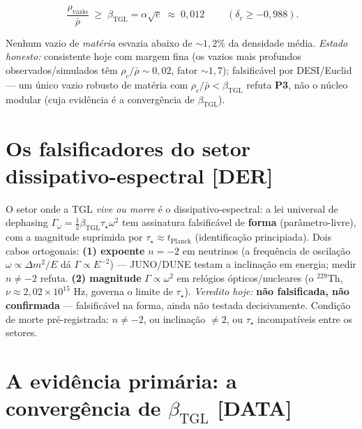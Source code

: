 \documentclass[11pt]{article}
\newcommand{\bTGL}{\beta_{\mathrm{TGL}}}\newcommand{\Msun}{M_{\odot}}\newcommand{\TGL}{\mathrm{TGL}}
\theoremstyle{definition}\newtheorem{deriv}{Derivação}
\begin{document}
\begin{equation}\boxed{\;\frac{\rho_{\mathrm{vazio}}}{\bar\rho}\;\geq\;\bTGL=\alpha\sqrt{e}\;\approx\;0{,}012\;}\qquad(\delta_c\geq-0{,}988).\end{equation}

Nenhum vazio de \emph{matéria} esvazia abaixo de $\sim1{,}2\%$ da densidade média. \emph{Estado honesto:} consistente hoje com margem fina (os vazios mais profundos observados/simulados têm $\rho_c/\bar\rho\sim0{,}02$, fator $\sim1{,}7$); falsificável por DESI/Euclid --- um único vazio robusto de matéria com $\rho_c/\bar\rho<\bTGL$ refuta \textbf{P3}, não o núcleo modular (cuja evidência é a convergência de $\bTGL$).

\section{Os falsificadores do setor dissipativo-espectral \textsf{[DER]}}

O setor onde a TGL \emph{vive ou morre} é o dissipativo-espectral: a lei universal de dephasing $\Gamma_\omega=\tfrac12\bTGL\tau_\star\omega^2$ tem assinatura falsificável de \textbf{forma} (parâmetro-livre), com a magnitude suprimida por $\tau_\star\approx t_{\mathrm{Planck}}$ (identificação principiada). Dois cabos ortogonais: \textbf{(1) expoente} $n=-2$ em neutrinos (a frequência de oscilação $\omega\propto\Delta m^2/E$ dá $\Gamma\propto E^{-2}$) --- JUNO/DUNE testam a inclinação em energia; medir $n\neq-2$ refuta. \textbf{(2) magnitude} $\Gamma\propto\omega^2$ em relógios ópticos/nucleares (o $^{229}$Th, $\nu\approx2{,}02\times10^{15}$ Hz, governa o limite de $\tau_\star$). \emph{Veredito hoje:} \textbf{não falsificada, não confirmada} --- falsificável na forma, ainda não testada decisivamente. Condição de morte pré-registrada: $n\neq-2$, ou inclinação $\neq2$, ou $\tau_\star$ incompatíveis entre os setores.

\section{A evidência primária: a convergência de $\bTGL$ \textsf{[DATA]}}
\end{document}
